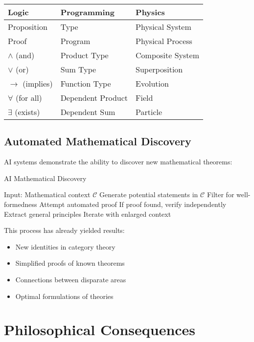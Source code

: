 \documentclass[11pt,a4paper]{article}
\begin{document}
\begin{center}
\begin{tabular}{|l|l|l|}
\hline
\textbf{Logic} & \textbf{Programming} & \textbf{Physics} \\
\hline
Proposition & Type & Physical System \\
Proof & Program & Physical Process \\
$\wedge$ (and) & Product Type & Composite System \\
$\vee$ (or) & Sum Type & Superposition \\
$\rightarrow$ (implies) & Function Type & Evolution \\
$\forall$ (for all) & Dependent Product & Field \\
$\exists$ (exists) & Dependent Sum & Particle \\
\hline
\end{tabular}
\end{center}

\subsection{Automated Mathematical Discovery}

AI systems demonstrate the ability to discover new mathematical theorems:

\begin{algorithm}
\caption{AI Mathematical Discovery}
\begin{algorithmic}[1]
\STATE Input: Mathematical context $\mathcal{C}$
\STATE Generate potential statements in $\mathcal{C}$
\STATE Filter for well-formedness
\STATE Attempt automated proof
\STATE If proof found, verify independently
\STATE Extract general principles
\STATE Iterate with enlarged context
\end{algorithmic}
\end{algorithm}

This process has already yielded results:
\begin{itemize}
    \item New identities in category theory
    \item Simplified proofs of known theorems
    \item Connections between disparate areas
    \item Optimal formulations of theories
\end{itemize}

\section{Philosophical Consequences}
\end{document}
